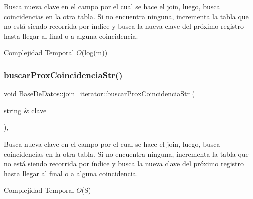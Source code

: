 Busca nueva clave en el campo por el cual se hace el join, luego, busca coincidencias en la otra tabla. Si no encuentra ninguna, incrementa la tabla que no está siendo recorrida por índice y busca la nueva clave del próximo registro hasta llegar al final o a alguna coincidencia. 


\begin{DoxyDescription}
\item[Complejidad Temporal]$O$(log(m))
\end{DoxyDescription}\mbox{\label{classBaseDeDatos_1_1join__iterator_a92d071b625b37f77d15ee1b2dd82ae3d}} 
\subsubsection{\texorpdfstring{buscar\+Prox\+Coincidencia\+Str()}{buscarProxCoincidenciaStr()}}
{\footnotesize\ttfamily void Base\+De\+Datos\+::join\+\_\+iterator\+::buscar\+Prox\+Coincidencia\+Str (\begin{DoxyParamCaption}\item[{string \&}]{clave }\end{DoxyParamCaption})\hspace{0.3cm}{\ttfamily [inline]}, {\ttfamily [private]}}



Busca nueva clave en el campo por el cual se hace el join, luego, busca coincidencias en la otra tabla. Si no encuentra ninguna, incrementa la tabla que no está siendo recorrida por índice y busca la nueva clave del próximo registro hasta llegar al final o a alguna coincidencia. 


\begin{DoxyDescription}
\item[Complejidad Temporal]$O$(S)
\end{DoxyDescription}\mbox{\label{classBaseDeDatos_1_1join__iterator_ab18c679b90081c47622e879ef8e5377c}} 
